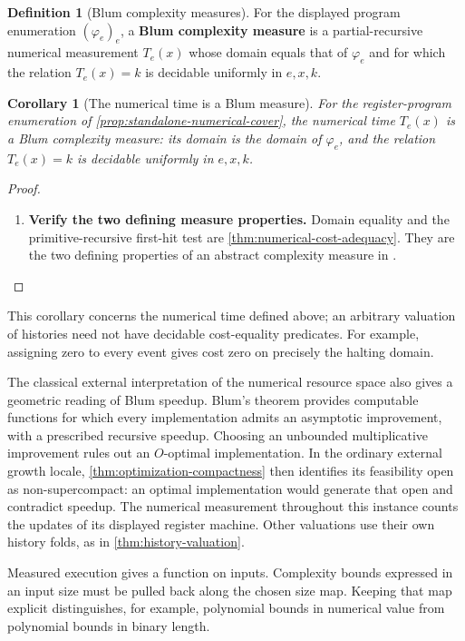\documentclass[11pt,a4paper]{article}
\numberwithin{algorithm}{section}
\numberwithin{equation}{section}
\newtheorem{corollary}[corollary]{Corollary}
\theoremstyle{definition}
\newtheorem{definition}[definition]{Definition}
\theoremstyle{remark}
\theoremstyle{plain}
\theoremstyle{definition}
\theoremstyle{plain}
\begin{document}
\begin{definition}[Blum complexity measures]\label{def:blum-measures}
For the displayed program enumeration $(\varphi_e)_e$, a
\textbf{Blum complexity measure} is a partial-recursive numerical
measurement $T_e(x)$ whose domain equals that of $\varphi_e$ and
for which the relation $T_e(x)=k$ is decidable uniformly in $e,x,k$.
\end{definition}

\begin{corollary}[The numerical time is a Blum measure]
\label{cor:blum-measure}
For the register-program enumeration of
\cref{prop:standalone-numerical-cover}, the numerical time
$T_e(x)$ is a Blum complexity measure: its domain is the domain
of $\varphi_e$, and the relation $T_e(x)=k$ is decidable uniformly
in $e,x,k$.
\end{corollary}
\begin{proof}\leavevmode
\begin{enumerate}[leftmargin=*,align=left]
\item \textbf{Verify the two defining measure properties.}
Domain equality and the primitive-recursive first-hit test are
\cref{thm:numerical-cost-adequacy}. They are the two defining
properties of an abstract complexity measure in
\citep{Blum1967MachineIndependentComplexity}.
\end{enumerate}
\end{proof}

This corollary concerns the numerical time defined above; an arbitrary
valuation of histories need not have decidable cost-equality predicates.
For example, assigning zero to every event gives cost zero
on precisely the halting domain.

The classical external interpretation of the numerical resource
space also gives a geometric reading of Blum speedup.
Blum's theorem provides computable functions for which every
implementation admits an asymptotic improvement, with a prescribed
recursive speedup. Choosing an unbounded multiplicative improvement
rules out an $O$-optimal implementation. In the ordinary external
growth locale, \cref{thm:optimization-compactness} then identifies its feasibility
open as non-supercompact: an optimal implementation would generate
that open and contradict speedup.
The numerical measurement throughout this instance counts the updates
of its displayed register machine. Other valuations use their own
history folds, as in \cref{thm:history-valuation}.

Measured execution gives a function on inputs. Complexity
bounds expressed in an input size must be pulled back along the
chosen size map. Keeping that map explicit distinguishes, for
example, polynomial bounds in numerical value from polynomial
bounds in binary length.
\end{document}
